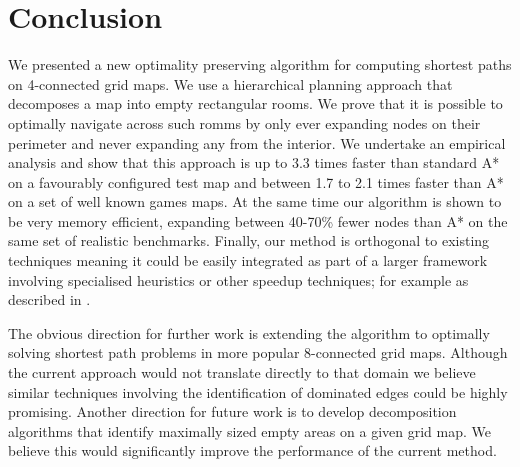 \section{Conclusion}
We presented a new optimality preserving algorithm for computing shortest paths
on 4-connected grid maps.
We use a hierarchical planning approach that decomposes a map into empty rectangular rooms.
We prove that it is possible to optimally navigate across such romms by only ever
expanding nodes on their perimeter and never expanding any from the interior.
We undertake an empirical analysis and show that this approach is up to 3.3 times faster than 
standard A* on a favourably configured test map and between 1.7 to 2.1 times faster than A* on 
a set of well known games maps. 
At the same time our algorithm is shown to be very memory efficient, 
expanding between 40-70\% fewer nodes than A* on the same set of realistic benchmarks.
Finally, our method is orthogonal to existing techniques meaning it could be easily integrated
as part of a larger framework involving specialised heuristics or other speedup techniques; 
for example as described in \cite{bjornsson05,bjornsson06}. 
\par
The obvious direction for further work is extending the algorithm to optimally solving 
shortest path problems in more popular 8-connected grid maps. 
Although the current approach would not translate directly to that domain we believe similar
techniques involving the identification of dominated edges could be highly promising.
Another direction for future work is to develop decomposition algorithms that identify maximally
sized empty areas on a given grid map.
We believe this would significantly improve the performance of the current method.
